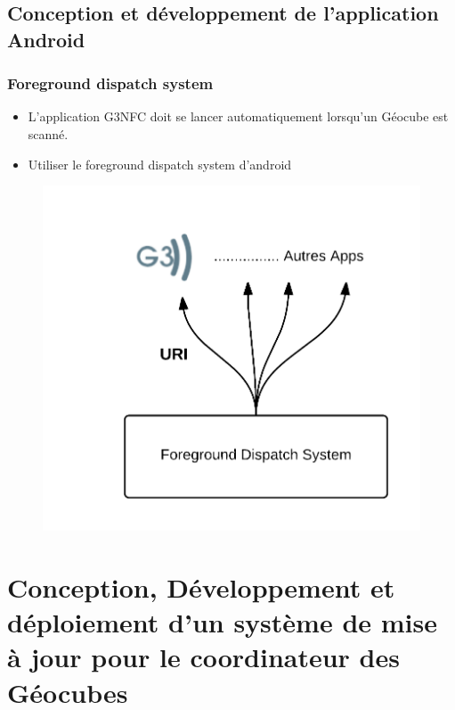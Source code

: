 \documentclass{beamer}
\begin{document}
\subsection{Conception et développement de l'application Android}
\begin{frame}
\frametitle{Foreground dispatch system}
\begin{itemize}
\item L'application G3NFC doit se lancer automatiquement lorsqu'un Géocube est scanné.
\item Utiliser le foreground dispatch system d'android
\end{itemize}
\begin{figure}
\centering
\includegraphics[scale=0.6]{images/foreground.png}

\end{figure}
\end{frame}

\section{Conception, Développement et déploiement d'un système de mise à jour pour le coordinateur des Géocubes}
\end{document}
